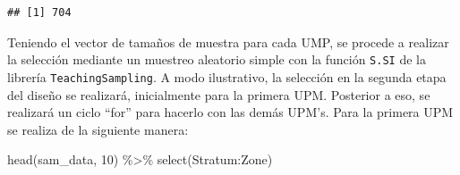 \documentclass[
  12pt,
]{book}
\newenvironment{Shaded}{\begin{snugshade}}{\end{snugshade}}
\newcommand{\AttributeTok}[1]{\textcolor[rgb]{0.77,0.63,0.00}{#1}}
\newcommand{\DecValTok}[1]{\textcolor[rgb]{0.00,0.00,0.81}{#1}}
\newcommand{\FunctionTok}[1]{\textcolor[rgb]{0.00,0.00,0.00}{#1}}
\newcommand{\NormalTok}[1]{#1}
\newcommand{\OtherTok}[1]{\textcolor[rgb]{0.56,0.35,0.01}{#1}}
\newcommand{\SpecialCharTok}[1]{\textcolor[rgb]{0.00,0.00,0.00}{#1}}
\newcommand{\StringTok}[1]{\textcolor[rgb]{0.31,0.60,0.02}{#1}}
\begin{document}
\begin{verbatim}
## [1] 704
\end{verbatim}

Teniendo el vector de tamaños de muestra para cada UMP, se procede a realizar la selección mediante un muestreo aleatorio simple con la función \texttt{S.SI} de la librería \texttt{TeachingSampling}. A modo ilustrativo, la selección en la segunda etapa del diseño se realizará, inicialmente para la primera UPM. Posterior a eso, se realizará un ciclo ``for'' para hacerlo con las demás UPM's. Para la primera UPM se realiza de la siguiente manera:

\begin{Shaded}
\end{Shaded}

\begin{Shaded}
\begin{Highlighting}[]
\FunctionTok{head}\NormalTok{(sam\_data, }\DecValTok{10}\NormalTok{) }\SpecialCharTok{\%\textgreater{}\%} \FunctionTok{select}\NormalTok{(Stratum}\SpecialCharTok{:}\NormalTok{Zone)}
\end{Highlighting}
\end{Shaded}
\end{document}
